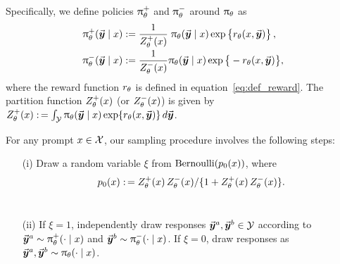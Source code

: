 	Specifically, we define policies $\uppi_{\theta}^+$ and $\uppi_{\theta}^-$ around $\uppi_{\theta}$ as
    \begin{subequations}
	\begin{align}
		\label{eq:def_policythetapos}
		\uppi_{\theta}^+(\vec{\boldsymbol{y}}\!\, \mid x)
		& := \frac{1}{Z_{\theta}^+(x)} \; \uppi_{\theta}(\vec{\boldsymbol{y}}\!\, \mid x)
		\exp \big\{ r_{\theta}(x, \vec{\boldsymbol{y}}\!\,) \big\} \, ,  \\[-1pt]
		\label{eq:def_policythetaneg}
		\uppi_{\theta}^-(\vec{\boldsymbol{y}}\!\, \mid x)
		& := \frac{1}{Z_{\theta}^-(x)} \uppi_{\theta}(\vec{\boldsymbol{y}}\!\, \mid x)
		\exp \big\{ - r_{\theta}(x, \vec{\boldsymbol{y}}\!\,) \big\},
	\end{align}
	\end{subequations}
	where the reward function $r_{\theta}$ is defined in equation~\eqref{eq:def_reward}.
	The partition function $Z_{\theta}^+(x)$ (or $Z_{\theta}^-(x)$) is given by
	\mbox{$Z_{\theta}^+(x)
	:\,= \int_{\mathcal{Y}} \uppi_{\theta}(\vec{\boldsymbol{y}}\!\, \mid x) \exp \{ r_{\theta}(x, \vec{\boldsymbol{y}}\!\,) \} \, {d } \vec{\boldsymbol{y}}\!\, $}. %
	
	For any prompt $x \in \mathcal{X}$, our sampling procedure involves the following steps:
	\begin{enumerate}  %
		\item[(i)] Draw a random variable $\xi$ from ${\rm Bernoulli}(p_0(x))$, where
        \vspace{-1em}
			$$p_0(x) :\,= {Z_{\theta}^+(x) \, Z_{\theta}^-(x)}/ \{1 + Z_{\theta}^+(x) \, Z_{\theta}^-(x) \}. $$ ~ \\ \vspace{-4em}
		\item[(ii)] If $\xi = 1$, independently draw responses $\vec{\boldsymbol{y}}\!\,^a, \vec{\boldsymbol{y}}\!\,^b \in \mathcal{Y}$ according to
		$\vec{\boldsymbol{y}}\!\,^a \sim \uppi_{\theta}^+(\cdot \mid x)$ and $\vec{\boldsymbol{y}}\!\,^b \sim \uppi_{\theta}^-(\cdot \mid x)$. 
		If $\xi = 0$, draw responses as $\vec{\boldsymbol{y}}\!\,^a, \vec{\boldsymbol{y}}\!\,^b \sim \uppi_{\theta}(\cdot \mid x)$.
	\end{enumerate}
	
